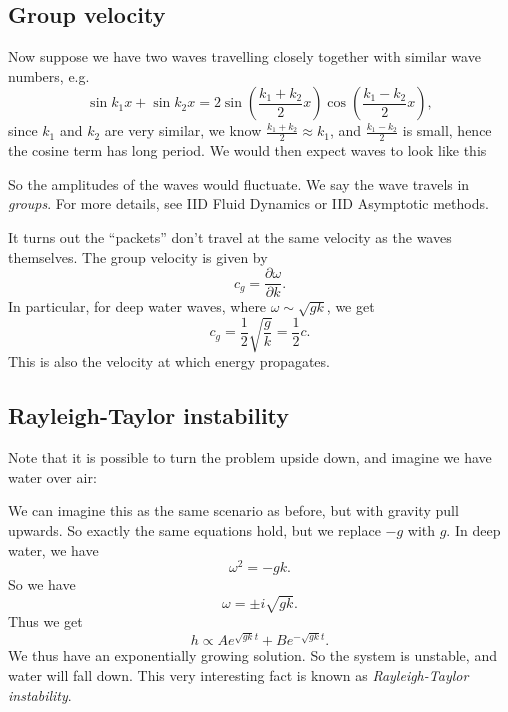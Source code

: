 \documentclass[a4paper]{article}
\begin{document}
\subsection{Group velocity}
Now suppose we have two waves travelling closely together with similar wave numbers, e.g.
\[
  \sin k_1 x + \sin k_2 x = 2 \sin \left(\frac{k_1 + k_2}{2} x\right) \cos\left(\frac{k_1 - k_2}{2}x\right),
\]
since $k_1$ and $k_2$ are very similar, we know $\frac{k_1 + k_2}{2} \approx k_1$, and $\frac{k_1 - k_2}{2}$ is small, hence the cosine term has long period. We would then expect waves to look like this
\begin{center}
\end{center}
So the amplitudes of the waves would fluctuate. We say the wave travels in \emph{groups}. For more details, see IID Fluid Dynamics or IID Asymptotic methods.

It turns out the ``packets'' don't travel at the same velocity as the waves themselves. The group velocity is given by
\[
  c_g = \frac{\partial \omega}{\partial k}.
\]
In particular, for deep water waves, where $\omega \sim \sqrt{gk}$, we get
\[
  c_g = \frac{1}{2} \sqrt{\frac{g}{k}} = \frac{1}{2}c.
\]
This is also the velocity at which energy propagates.

\subsection{Rayleigh-Taylor instability}
Note that it is possible to turn the problem upside down, and imagine we have water over air:
\begin{center}
\end{center}
We can imagine this as the same scenario as before, but with gravity pull upwards. So exactly the same equations hold, but we replace $-g$ with $g$. In deep water, we have
\[
  \omega^2 = -gk.
\]
So we have
\[
  \omega = \pm i\sqrt{gk}.
\]
Thus we get
\[
  h \propto A e^{\sqrt{gk} t} + B e^{-\sqrt{gk}t}.
\]
We thus have an exponentially growing solution. So the system is unstable, and water will fall down. This very interesting fact is known as \emph{Rayleigh-Taylor instability}.
\end{document}
